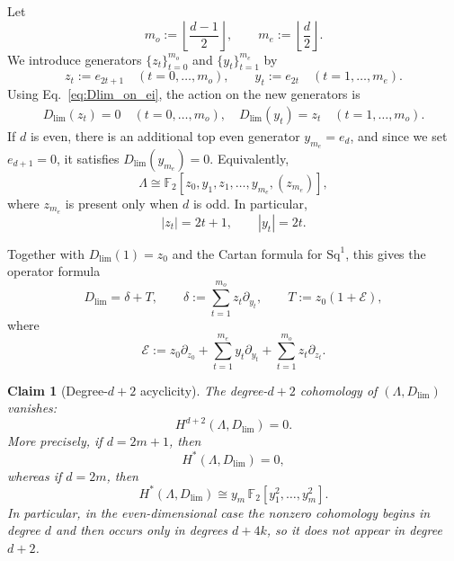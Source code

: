 \documentclass[aps,prx,reprint,superscriptaddress,twocolumn,amsmath,amssymb,amsfonts, nofootinbib]{revtex4-2}
\newcommand{\Sq}{\text{Sq}}
\theoremstyle{apsstyle}
\newtheorem{claim}{Claim}
\begin{document}
\noindent Let
\begin{equation}
m_o:=\left\lfloor\frac{d-1}{2}\right\rfloor,
\qquad
m_e:=\left\lfloor\frac{d}{2}\right\rfloor.
\end{equation}
We introduce generators $\{z_t\}_{t=0}^{m_o}$ and $\{y_t\}_{t=1}^{m_e}$ by
\begin{equation}
z_t:=e_{2t+1}\quad (t=0,\dots,m_o), \qquad y_t:=e_{2t}\quad (t=1,\dots,m_e).
\end{equation}
Using Eq.~\eqref{eq:Dlim_on_ei}, the action on the new generators is
\begin{gather}
D_{\lim}(z_t)=0 \quad (t=0,\dots,m_o),\quad D_{\lim}(y_t)=z_t \quad (t=1,\dots,m_o).
\end{gather}
If $d$ is even, there is an additional top even generator $y_{m_e}=e_d$, and since we set $e_{d+1}=0$, it satisfies $D_{\lim}(y_{m_e})=0$.
Equivalently,
\begin{equation}
\Lambda \cong \mathbb F_2[z_0,y_1,z_1,\dots,y_{m_e},(z_{m_e})],
\end{equation}
where $z_{m_e}$ is present only when $d$ is odd. In particular,
\begin{equation}
|z_t|=2t+1, \qquad |y_t|=2t.
\end{equation}

\noindent Together with $D_{\lim}(1)=z_0$ and the Cartan formula for $\Sq^1$, this gives the operator formula
\begin{equation}
D_{\lim}=\delta+T, \qquad \delta:=\sum_{t=1}^{m_o}z_t\partial_{y_t},
\qquad T:=z_0(1+\mathcal E),
\end{equation}
where
\begin{equation}
\mathcal E
:=
z_0\partial_{z_0}
+
\sum_{t=1}^{m_e}y_t\partial_{y_t}
+
\sum_{t=1}^{m_o}z_t\partial_{z_t}.
\end{equation}

\bigskip 

\begin{claim}[Degree-$d+2$ acyclicity]
\label{claim:degree_dplus2_acyclic}
The degree-$d+2$ cohomology of $(\Lambda,D_{\lim})$ vanishes:
\begin{equation}
H^{d+2}(\Lambda,D_{\lim})=0.
\end{equation}
More precisely, if $d=2m+1$, then
\begin{equation}
H^{*}(\Lambda,D_{\lim})=0,
\end{equation}
whereas if $d=2m$, then
\begin{equation}
H^{*}(\Lambda,D_{\lim})
\cong
y_m\,\mathbb F_2[y_1^2,\dots,y_m^2].
\end{equation}
In particular, in the even-dimensional case the nonzero cohomology begins in degree $d$ and then occurs only in degrees $d+4k$, so it does not appear in degree $d+2$.
\end{claim}
\end{document}
